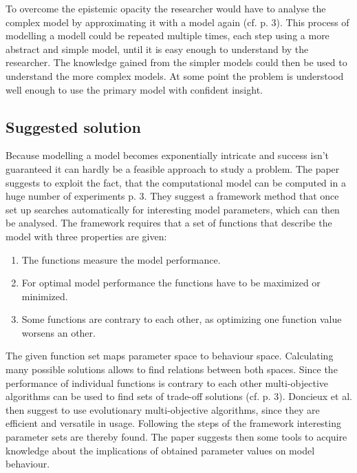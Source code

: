 \documentclass[12pt,twoside]{article}
\theoremstyle{plain}
\theoremstyle{definition}
\theoremstyle{remark}
\begin{document}
To overcome the epistemic opacity the researcher would have to analyse the complex model by approximating it with a model again (cf. \cite{doncieux2015multi} p. 3). This process of modelling a modell could be repeated multiple times, each step using a more abstract and simple model, until it is easy enough to understand by the researcher. The knowledge gained from the simpler models could then be used to understand the more complex models. At some point the problem is understood well enough to use the primary model with confident insight.

\subsection{Suggested solution}
Because modelling a model becomes exponentially intricate and success isn't guaranteed it can hardly be a feasible approach to study a problem. The paper suggests to exploit the fact, that the computational model can be computed in a \glqq huge number of experiments\grqq{} \cite{doncieux2015multi} p. 3.
They suggest a framework method that once set up searches automatically for interesting model parameters, which can then be analysed.
The framework requires that a set of functions that describe the model with three properties are given:
\begin{enumerate}
	\item The functions measure the model performance.
	\item For optimal model performance the functions have to be maximized or minimized.
	\item Some functions are contrary to each other, as optimizing one function value worsens an other.
\end{enumerate}
The given function set maps parameter space to behaviour space. Calculating many possible solutions allows to find relations between both spaces.
Since the performance of individual functions is contrary to each other multi-objective algorithms can be used to find sets of trade-off solutions (cf. \cite{doncieux2015multi} p. 3).
Doncieux et al. then suggest to use evolutionary multi-objective algorithms, since they are efficient and versatile in usage. Following the steps of the framework interesting parameter sets are thereby found.
The paper suggests then some tools to acquire knowledge about the implications of obtained parameter values on model behaviour.
\end{document}
